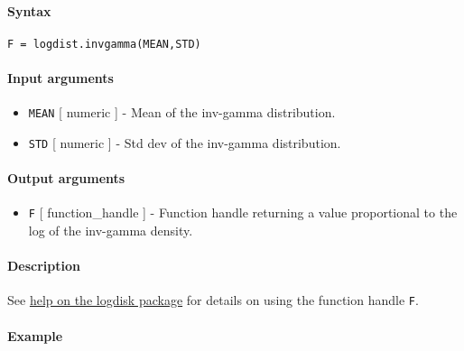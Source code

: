 


	\paragraph{Syntax}\label{syntax}

\begin{verbatim}
F = logdist.invgamma(MEAN,STD)
\end{verbatim}

\paragraph{Input arguments}\label{input-arguments}

\begin{itemize}
\item
  \texttt{MEAN} {[} numeric {]} - Mean of the inv-gamma distribution.
\item
  \texttt{STD} {[} numeric {]} - Std dev of the inv-gamma distribution.
\end{itemize}

\paragraph{Output arguments}\label{output-arguments}

\begin{itemize}
\itemsep1pt\parskip0pt
\item
  \texttt{F} {[} function\_handle {]} - Function handle returning a
  value proportional to the log of the inv-gamma density.
\end{itemize}

\paragraph{Description}\label{description}

See \href{logdist/Contents}{help on the logdisk package} for details on
using the function handle \texttt{F}.

\paragraph{Example}\label{example}


